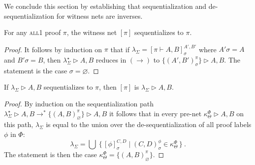 \documentclass[UKenglish]{lipics-v2016}
\theoremstyle{plain}
\newcommand\all{\textsc{all}}
\newcommand\+{+}
\renewcommand\*{\times}
\newcommand\prf[3]{#1\vdash\!#2,#3}
\newcommand\net[3]{#1\triangleright #2,#3}
\newcommand\deseq[4][\sigma]{[#2]_{#1}^{#3,#4}}
\newcommand\link[3][\sigma]{(#2,#3)_{#1}}
\newcommand\scoal{\rightarrow} %
\begin{document}
We conclude this section by establishing that sequentialization and de-sequentialization for witness nets are inverses.

\begin{theorem}
\label{thm:proof->net->proof}
For any \all1 proof $\pi$, the witness net $[\pi]$ sequentializes to $\pi$. 
\end{theorem}

\begin{proof}
It follows by induction on $\pi$ that if $\lambda_\Sigma=\deseq{\prf\pi AB}{A'}{B'}$ where $A'\sigma=A$ and $B'\sigma=B$, then $\net{\lambda^\star_\Sigma}AB$ reduces in $(\scoal)$ to $\net{\{\link{A'}{B'}^\pi\}}AB$. The statement is the case $\sigma=\varnothing$.
\end{proof}

\begin{theorem}
\label{thm:net->proof->net}
If $\net{\lambda_\Sigma}AB$ sequentializes to $\pi$, then $[\pi]$ is $\net{\lambda_\Sigma}AB$. 
\end{theorem}

\begin{proof}
By induction on the sequentialization path 
$\net{\lambda_\Sigma^\star}AB\scoal^*\net{\{\link[\varnothing]AB^\pi\}}AB$
it follows that in every pre-net $\net{\kappa_\Theta^\Phi}AB$ on this path, $\lambda_\Sigma$ is equal to the union over the de-sequentialization of all proof labels $\phi$ in $\Phi$:
\[
	\lambda_\Sigma=\bigcup~\{\,\deseq\phi CD \mid \link CD^\phi \in \kappa_\Theta^\Phi\,\}~.
\]
The statement is then the case $\kappa_\Theta^\Phi=\{\link[\varnothing]AB^\pi\}$.
\end{proof}
\end{document}
